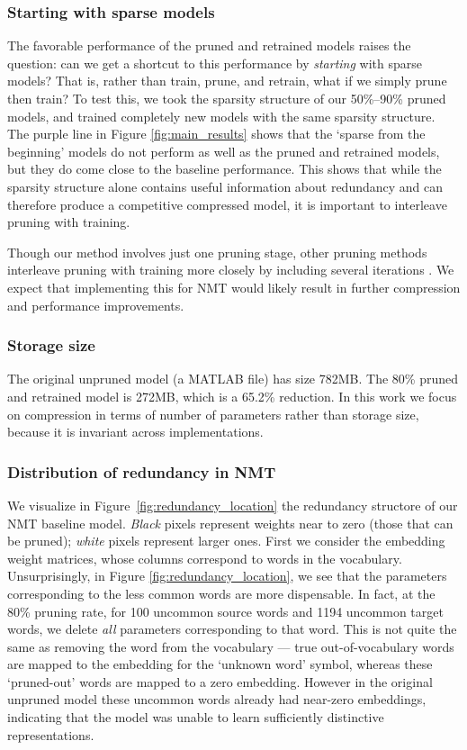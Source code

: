 \subsubsection{Starting with sparse models}
\label{subsec:sparse}
The favorable performance of the pruned and retrained models raises the question: can we get a shortcut to this performance by \emph{starting} with sparse models?
That is, rather than train, prune, and retrain, what if we simply prune then train?
To test this, we took the sparsity structure of our 50\%--90\% pruned models, and trained completely new models with the same sparsity structure.
The purple line in Figure \ref{fig:main_results} shows that the `sparse from the beginning' models do not perform as well as the pruned and retrained models, but they do come close to the baseline performance.
This shows that while the sparsity structure alone contains useful information about redundancy and can therefore produce a competitive compressed model, it is important to interleave pruning with training.

Though our method involves just one pruning stage, other pruning methods interleave pruning with training more closely by including several iterations \cite{collins2014memory,han2015learning}.
We expect that implementing this for NMT would likely result in further compression and performance improvements.



\subsubsection{Storage size}
The original unpruned model (a MATLAB file) has size 782MB.
The 80\% pruned and retrained model is 272MB, which is a 65.2\% reduction.
In this work we focus on compression in terms of number of parameters rather than storage size, because it is invariant across implementations.

\subsubsection{Distribution of redundancy in NMT}
\label{subsubsec:redundancy}

We visualize in Figure~\ref{fig:redundancy_location} the redundancy structore of
our NMT baseline model.
{\it Black} pixels represent weights near to zero (those that can be pruned); {\it white} pixels represent larger ones.
First we consider the embedding weight matrices, whose columns correspond to words in the vocabulary.
Unsurprisingly, in Figure \ref{fig:redundancy_location}, we see that the parameters corresponding to the less common words are more dispensable.
In fact, at the 80\% pruning rate, for 100 uncommon source words and 1194
uncommon target words, we delete \emph{all} parameters corresponding to that word.
This is not quite the same as removing the word from the vocabulary --- true out-of-vocabulary words are mapped to the embedding for the `unknown word' symbol, whereas these `pruned-out' words are mapped to a zero embedding.
However in the original unpruned model these uncommon words already had near-zero embeddings, indicating that the model was unable to learn sufficiently distinctive representations.

